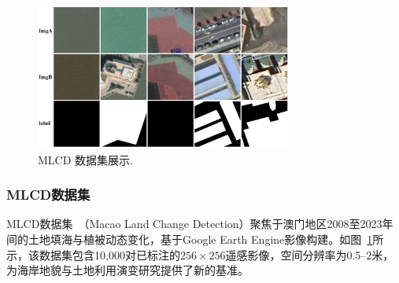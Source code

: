\begin{figure}[!htbp]
  \centering
  \includegraphics[width=0.75\textwidth]{paper_figures/变化检测任务与实验方法介绍/mlcd.png}
  \caption{MLCD 数据集展示.}
  \label{fig:mlcd}
\end{figure}

\subsubsection{MLCD数据集}
MLCD数据集~\cite{Huang2025SAMBasedEF}（Macao Land Change Detection）聚焦于澳门地区2008至2023年间的土地填海与植被动态变化，基于Google Earth Engine影像构建。如图~\ref{fig:mlcd}所示，该数据集包含10,000对已标注的$256\times256$遥感影像，空间分辨率为0.5–2米，为海岸地貌与土地利用演变研究提供了新的基准。


